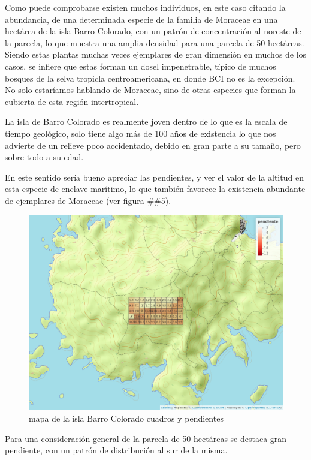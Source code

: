 \documentclass[11pt,]{article}
\begin{document}
Como puede comprobarse existen muchos individuos, en este caso citando
la abundancia, de una determinada especie de la familia de Moraceae en
una hectárea de la isla Barro Colorado, con un patrón de concentración
al noreste de la parcela, lo que muestra una amplia densidad para una
parcela de 50 hectáreas. Siendo estas plantas muchas veces ejemplares de
gran dimensión en muchos de los casos, se infiere que estas forman un
dosel impenetrable, típico de muchos bosques de la selva tropicla
centroamericana, en donde BCI no es la excepción. No solo estaríamos
hablando de Moraceae, sino de otras especies que forman la cubierta de
esta región intertropical.

La isla de Barro Colorado es realmente joven dentro de lo que es la
escala de tiempo geológico, solo tiene algo más de 100 años de
existencia lo que nos advierte de un relieve poco accidentado, debido en
gran parte a su tamaño, pero sobre todo a su edad.

En este sentido sería bueno apreciar las pendientes, y ver el valor de
la altitud en esta especie de enclave marítimo, lo que también favorece
la existencia abundante de ejemplares de Moraceae (ver figura \#\#5).

\begin{figure}
\centering
\includegraphics[width=1.00000\textwidth]{mapa_cuadros_pendiente.png}
\caption{mapa de la isla Barro Colorado cuadros y pendientes
\label{fig:bci_map}}
\end{figure}

Para una consideración general de la parcela de 50 hectáreas se destaca
gran pendiente, con un patrón de distribución al sur de la misma.
\end{document}
